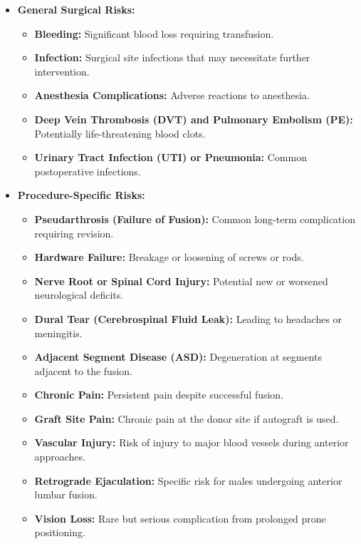 \begin{itemize}
  \item \textbf{General Surgical Risks:}
    \begin{itemize}
      \item \textbf{Bleeding:} Significant blood loss requiring transfusion.
      \item \textbf{Infection:} Surgical site infections that may necessitate further intervention.
      \item \textbf{Anesthesia Complications:} Adverse reactions to anesthesia.
      \item \textbf{Deep Vein Thrombosis (DVT) and Pulmonary Embolism (PE):} Potentially life-threatening blood clots.
      \item \textbf{Urinary Tract Infection (UTI) or Pneumonia:} Common postoperative infections.
    \end{itemize}
  
  \item \textbf{Procedure-Specific Risks:}
    \begin{itemize}
      \item \textbf{Pseudarthrosis (Failure of Fusion):} Common long-term complication requiring revision.
      \item \textbf{Hardware Failure:} Breakage or loosening of screws or rods.
      \item \textbf{Nerve Root or Spinal Cord Injury:} Potential new or worsened neurological deficits.
      \item \textbf{Dural Tear (Cerebrospinal Fluid Leak):} Leading to headaches or meningitis.
      \item \textbf{Adjacent Segment Disease (ASD):} Degeneration at segments adjacent to the fusion.
      \item \textbf{Chronic Pain:} Persistent pain despite successful fusion.
      \item \textbf{Graft Site Pain:} Chronic pain at the donor site if autograft is used.
      \item \textbf{Vascular Injury:} Risk of injury to major blood vessels during anterior approaches.
      \item \textbf{Retrograde Ejaculation:} Specific risk for males undergoing anterior lumbar fusion.
      \item \textbf{Vision Loss:} Rare but serious complication from prolonged prone positioning.
    \end{itemize}
\end{itemize}

